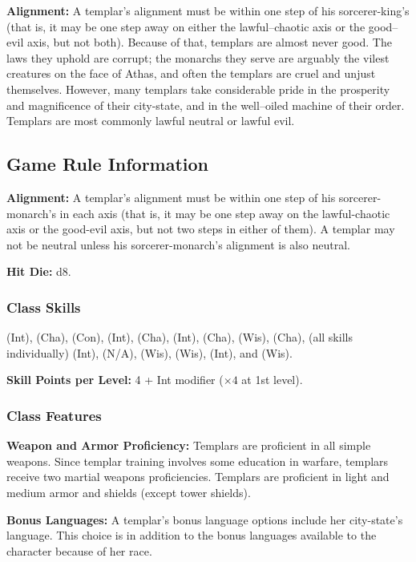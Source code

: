 \textbf{Alignment:} A templar's alignment must be within one step of his sorcerer-king's (that is, it may be one step away on either the lawful--chaotic axis or the good--evil axis, but not both). Because of that, templars are almost never good. The laws they uphold are corrupt; the monarchs they serve are arguably the vilest creatures on the face of Athas, and often the templars are cruel and unjust themselves. However, many templars take considerable pride in the prosperity and magnificence of their city-state, and in the well--oiled machine of their order. Templars are most commonly lawful neutral or lawful evil.

\subsection{Game Rule Information}
\textbf{Alignment:} A templar's alignment must be within one step of his sorcerer-monarch's in each axis (that is, it may be one step away on the lawful-chaotic axis or the good-evil axis, but not two steps in either of them). A templar may not be neutral unless his sorcerer-monarch's alignment is also neutral.

\textbf{Hit Die:} d8.

\subsubsection{Class Skills}
 (Int),  (Cha),  (Con),  (Int),  (Cha),  (Int),  (Cha),  (Wis),  (Cha),  (all skills individually) (Int),  (N/A),  (Wis),  (Wis),  (Int), and  (Wis).

\textbf{Skill Points per Level:} 4 + Int modifier ($\times 4$ at 1st level).

\subsubsection{Class Features}
\textbf{Weapon and Armor Proficiency:} Templars are proficient in all simple weapons. Since templar training involves some education in warfare, templars receive two martial weapons proficiencies. Templars are proficient in light and medium armor and shields (except tower shields).

\textbf{Bonus Languages:} A templar's bonus language options include her city-state's language. This choice is in addition to the bonus languages available to the character because of her race.

